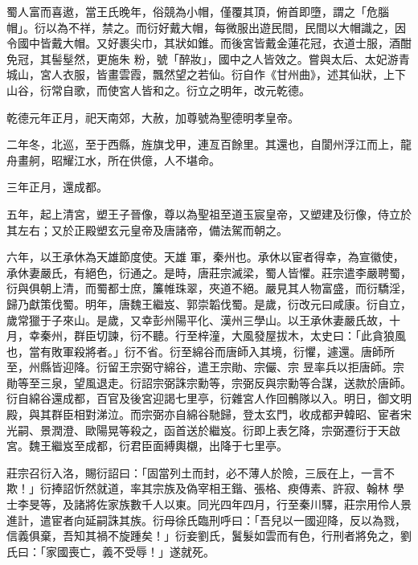 \begin{pinyinscope}
 蜀人富而喜遨，當王氏晚年，俗競為小帽，僅覆其頂，俯首即墮，謂之「危腦帽」。衍以為不祥，禁之。而衍好戴大帽，每微服出遊民間，民間以大帽識之，因令國中皆戴大帽。又好裹尖巾，其狀如錐。而後宮皆戴金蓮花冠，衣道士服，酒酣免冠，其髻髽然，更施朱
 粉，號「醉妝」，國中之人皆效之。嘗與太后、太妃游青城山，宮人衣服，皆畫雲霞，飄然望之若仙。衍自作《甘州曲》，述其仙狀，上下山谷，衍常自歌，而使宮人皆和之。衍立之明年，改元乾德。



 乾德元年正月，祀天南郊，大赦，加尊號為聖德明孝皇帝。



 二年冬，北巡，至于西縣，旌旗戈甲，連亙百餘里。其還也，自閬州浮江而上，龍舟畫舸，昭耀江水，所在供億，人不堪命。



 三年正月，還成都。



 五年，起上清宮，塑王子晉像，尊以為聖祖至道玉宸皇帝，又塑建及衍像，侍立於其左右；又於正殿塑玄元皇帝及唐諸帝，備法駕而朝之。



 六年，以王承休為天雄節度使。天雄
 軍，秦州也。承休以宦者得幸，為宣徽使，承休妻嚴氏，有絕色，衍通之。是時，唐莊宗滅梁，蜀人皆懼。莊宗遣李嚴聘蜀，衍與俱朝上清，而蜀都士庶，簾帷珠翠，夾道不絕。嚴見其人物富盛，而衍驕淫，歸乃獻策伐蜀。明年，唐魏王繼岌、郭崇韜伐蜀。是歲，衍改元曰咸康。衍自立，歲常獵于子來山。是歲，又幸彭州陽平化、漢州三學山。以王承休妻嚴氏故，十月，幸秦州，群臣切諫，衍不聽。行至梓潼，大風發屋拔木，太史曰：「此貪狼風也，當有敗軍殺將者。」衍不省。衍至綿谷而唐師入其境，衍懼，遽還。唐師所至，州縣皆迎降。衍留王宗弼守綿谷，遣王宗勛、宗儼、宗
 昱率兵以拒唐師。宗勛等至三泉，望風退走。衍詔宗弼誅宗勳等，宗弼反與宗勳等合謀，送款於唐師。衍自綿谷還成都，百官及後宮迎謁七里亭，衍雜宮人作回鶻隊以入。明日，御文明殿，與其群臣相對涕泣。而宗弼亦自綿谷馳歸，登太玄門，收成都尹韓昭、宦者宋光嗣、景潤澄、歐陽晃等殺之，函首送於繼岌。衍即上表乞降，宗弼遷衍于天啟宮。魏王繼岌至成都，衍君臣面縛輿櫬，出降于七里亭。



 莊宗召衍入洛，賜衍詔曰：「固當列土而封，必不薄人於險，三辰在上，一言不欺！」衍捧詔忻然就道，率其宗族及偽宰相王鍇、張格、瘐傳素、許寂、翰林
 學士李旻等，及諸將佐家族數千人以東。同光四年四月，行至秦川驛，莊宗用伶人景進計，遣宦者向延嗣誅其族。衍母徐氏臨刑呼曰：「吾兒以一國迎降，反以為戮，信義俱棄，吾知其禍不旋踵矣！」衍妾劉氏，鬒髮如雲而有色，行刑者將免之，劉氏曰：「家國喪亡，義不受辱！」遂就死。




\end{pinyinscope}
